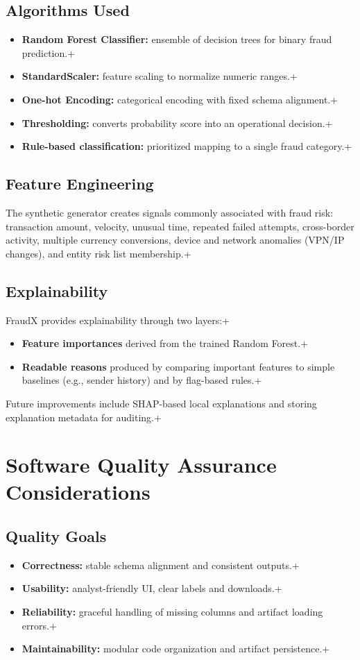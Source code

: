 \documentclass[12pt,a4paper]{report}
\begin{document}
\section{Algorithms Used}
\begin{itemize}
  \item \textbf{Random Forest Classifier:} ensemble of decision trees for binary fraud prediction.\n+  \item \textbf{StandardScaler:} feature scaling to normalize numeric ranges.\n+  \item \textbf{One-hot Encoding:} categorical encoding with fixed schema alignment.\n+  \item \textbf{Thresholding:} converts probability score into an operational decision.\n+  \item \textbf{Rule-based classification:} prioritized mapping to a single fraud category.\n+\end{itemize}

\section{Feature Engineering}
The synthetic generator creates signals commonly associated with fraud risk: transaction amount, velocity, unusual time, repeated failed attempts, cross-border activity, multiple currency conversions, device and network anomalies (VPN/IP changes), and entity risk list membership.\n+
\section{Explainability}
FraudX provides explainability through two layers:\n+\begin{itemize}
  \item \textbf{Feature importances} derived from the trained Random Forest.\n+  \item \textbf{Readable reasons} produced by comparing important features to simple baselines (e.g., sender history) and by flag-based rules.\n+\end{itemize}
Future improvements include SHAP-based local explanations and storing explanation metadata for auditing.\n+
\chapter{Software Quality Assurance Considerations}
\section{Quality Goals}
\begin{itemize}
  \item \textbf{Correctness:} stable schema alignment and consistent outputs.\n+  \item \textbf{Usability:} analyst-friendly UI, clear labels and downloads.\n+  \item \textbf{Reliability:} graceful handling of missing columns and artifact loading errors.\n+  \item \textbf{Maintainability:} modular code organization and artifact persistence.\n+\end{itemize}
\end{document}
